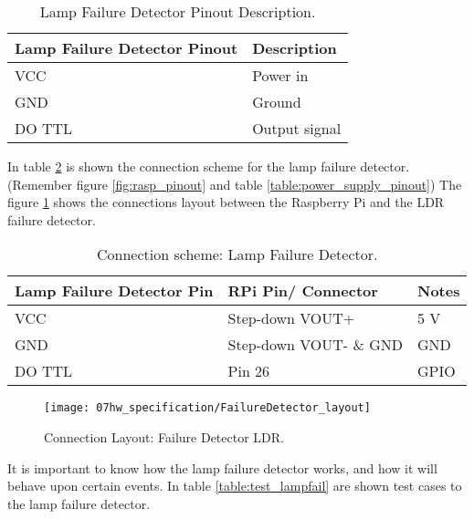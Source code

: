 \begin{table}[H]
	\centering
	\begin{tabular}{|m{5cm}|m{6cm}|}
		\hline
		\textbf{Lamp Failure Detector Pinout} & \textbf{Description}
		\\\hline\hline
		
		VCC & Power in\\\hline
		GND & Ground\\\hline
		DO TTL & Output signal \\\hline
	\end{tabular}
	
	\caption{Lamp Failure Detector Pinout Description.}
	\label{table:LampFailPinout}
\end{table}


In table \ref{table:connect_lampfail} is shown the connection scheme for the lamp failure detector. (Remember figure \ref{fig:rasp_pinout} and table \ref{table:power_supply_pinout})
The figure \ref{fig:failLayout} shows the connections layout between the Raspberry Pi and the LDR failure detector.


\begin{table}[H]
	\centering
	\begin{tabular}{|m{4cm}|m{5cm}|m{3cm}|}
		\hline
		\textbf{Lamp Failure Detector Pin} & \textbf{RPi Pin/ Connector} & \textbf{Notes} 
		\\\hline\hline
		
		VCC & Step-down VOUT+ & 5 V
		\\\hline
		GND & Step-down VOUT- \& GND & GND
		\\\hline
		DO TTL & Pin 26 & GPIO
		\\\hline
	\end{tabular}
	
	\caption{Connection scheme: Lamp Failure Detector.}
	\label{table:connect_lampfail}
\end{table}

\begin{figure}[H]
	\centering
	\texttt{[image: 07hw\_specification/FailureDetector\_layout]}
	\caption{Connection Layout: Failure Detector LDR.}
	\label{fig:failLayout}
\end{figure}


It is important to know how the lamp failure detector works, and how it will behave upon certain events. In table \ref{table:test_lampfail} are shown test cases to the lamp failure detector.

